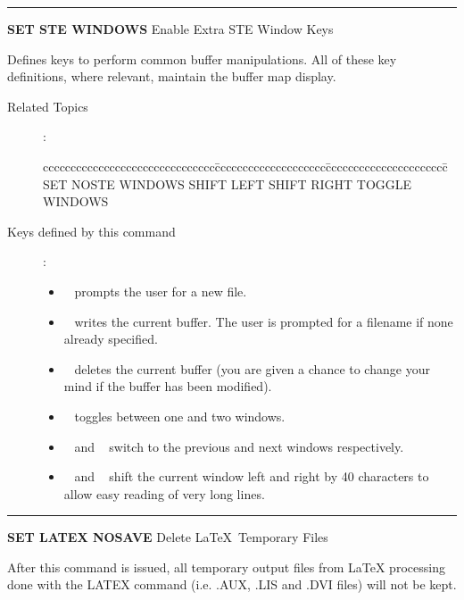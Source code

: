 \goodbreak

\rule{\textwidth}{0.3mm}

{\Large {\bf SET STE WINDOWS} \hfill Enable Extra STE Window Keys}

\medskip
  Defines keys to perform common buffer manipulations. All of
  these key definitions, where relevant, maintain the buffer map
  display.

\begin{description}
\item[Related Topics]:
\begin{tabbing}
ccccccccccccccccccccccccccccccc\=cccccccccccccccccccc\=cccccccccccccccccccccc\=\kill
SET NOSTE WINDOWS \> SHIFT LEFT  \> SHIFT RIGHT \> TOGGLE WINDOWS \\
\end{tabbing}

\item[Keys defined by this command]:
       \begin{itemize}
       \item \gold\  prompts the user for a new file.
       \item \gold\  writes the current buffer. The user is
             prompted for a filename if none already specified.
       \item \gold\  deletes the current buffer (you are
             given a chance to change your mind if the buffer has been
             modified).
       \item \gold\ \keyname{=} toggles between one and two windows.
       \item \gold\ \keyname{$\bigtriangleup$} and \gold\
             \keyname{$\bigtriangledown$} switch to the previous and next
             windows respectively.
       \item \gold\ \keyname{$\lhd$} and \gold\ \keyname{$\rhd$} shift the
             current window left and right by 40 characters to allow easy
             reading of very long lines.
       \end{itemize}

\end{description}

\goodbreak

\rule{\textwidth}{0.3mm}

{\Large {\bf SET LATEX NOSAVE} \hfill Delete \LaTeX\ Temporary Files}

\medskip
  After this command is issued, all temporary output files from LaTeX
  processing done with the LATEX command (i.e. .AUX,
   .LIS and .DVI files) will not be kept.

